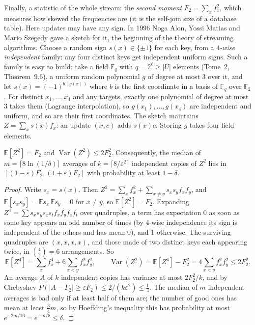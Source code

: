 Finally, a statistic of the whole stream: the \emph{second moment} $F_2=\sum_xf_x^2$, which measures how skewed the frequencies are (it is the self-join size of a database table). Here updates may have any sign. In 1996 Noga Alon, Yossi Matias and Mario Szegedy gave a sketch for it, the beginning of the
theory of streaming algorithms. Choose a random sign $s(x)\in\{\pm1\}$ for each key, from a \emph{$4$-wise independent} family: any four distinct keys get independent uniform signs. Such a family is easy to build: take a field $\mathbb F_q$ with $q=2^\ell\ge|U|$ elements (Tome~2, Theorem~9.6), a uniform random polynomial $g$ of degree at most $3$ over it,
and let $s(x)=(-1)^{b(g(x))}$ where $b$ is the first coordinate in a basis of $\mathbb F_q$ over $\mathbb F_2$. For distinct $x_1,\dots,x_4$ and any targets, exactly one polynomial of degree at most $3$ takes them (Lagrange interpolation), so $g(x_1),\dots,g(x_4)$ are independent and uniform, and so are their first coordinates.
The sketch maintains $Z=\sum_xs(x)f_x$: an update $(x,c)$ adds $s(x)c$. Storing $g$ takes four field elements.

\begin{theorem}\label{thm:ams}
$\mathbb E[Z^2]=F_2$ and $\operatorname{Var}(Z^2)\le2F_2^2$. Consequently, the median of $m=\lceil8\ln(1/\delta)\rceil$ averages of $k=\lceil8/\varepsilon^2\rceil$ independent copies of $Z^2$ lies in $[(1-\varepsilon)F_2,(1+\varepsilon)F_2]$ with probability at least $1-\delta$.
\end{theorem}
\begin{proof}
Write $s_x=s(x)$. Then $Z^2=\sum_xf_x^2+\sum_{x\ne y}s_xs_yf_xf_y$, and $\mathbb E[s_xs_y]=\mathbb E s_x\,\mathbb Es_y=0$ for $x\ne y$, so $\mathbb E[Z^2]=F_2$. Expanding $Z^4=\sum s_xs_ys_zs_tf_xf_yf_zf_t$ over quadruples, a term has expectation $0$ as soon as some key appears an odd number of times (by
$4$-wise independence its sign is independent of the others and has mean $0$), and $1$ otherwise. The surviving quadruples are $(x,x,x,x)$, and those made of two distinct keys each appearing twice, in $\binom42=6$ arrangements. So
\[
\mathbb E[Z^4]=\sum_xf_x^4+6\sum_{x<y}f_x^2f_y^2,\qquad\operatorname{Var}(Z^2)=\mathbb E[Z^4]-F_2^2=4\sum_{x<y}f_x^2f_y^2\le2F_2^2.
\]
An average $A$ of $k$ independent copies has variance at most $2F_2^2/k$, and by Chebyshev $P(|A-F_2|\ge\varepsilon F_2)\le2/(k\varepsilon^2)\le\frac14$. The median of $m$ independent averages is bad only if at least half of them are; the number of good ones has mean at least
$\frac34m$, so by Hoeffding's inequality this has probability at most $e^{-2m/16}=e^{-m/8}\le\delta$.
\end{proof}

